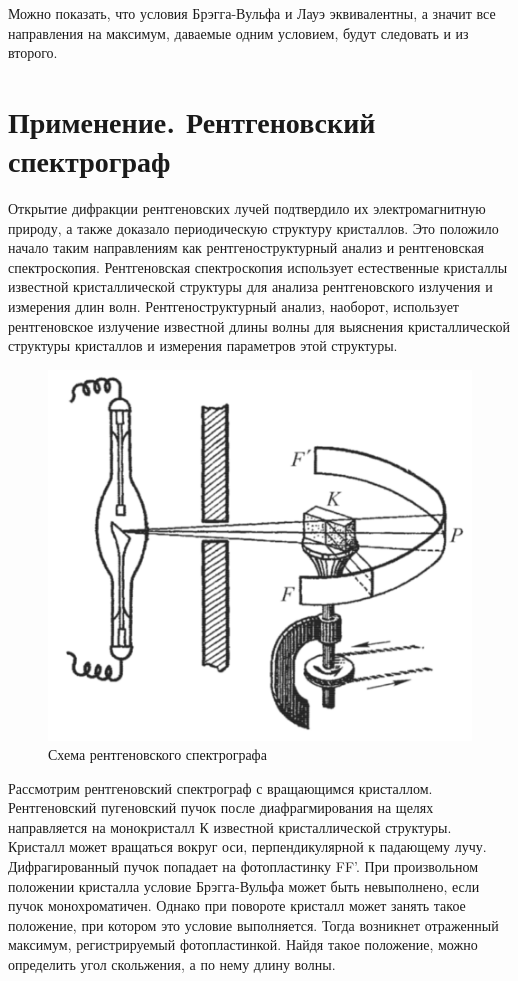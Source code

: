 \documentclass[12pt]{kiarticle} %
\begin{document}
Можно показать, что условия Брэгга-Вульфа и Лауэ эквивалентны, а значит все направления на максимум, даваемые одним условием, будут следовать и из второго. 

\section{Применение. Рентгеновский спектрограф}
Открытие дифракции рентгеновских лучей подтвердило их электромагнитную природу, а также доказало периодическую структуру кристаллов. Это положило начало таким направлениям как рентгеноструктурный анализ и рентгеновская спектроскопия. Рентгеновская спектроскопия использует естественные кристаллы известной кристаллической структуры для анализа рентгеновского излучения и измерения длин волн. Рентгеноструктурный анализ, наоборот, использует рентгеновское излучение известной длины волны для выяснения кристаллической структуры кристаллов и измерения параметров этой структуры.

\begin{figure}[H]
	\begin{center}
		\includegraphics[width=0.6\linewidth]{pic5.png}
		\caption{Схема рентгеновского спектрографа} 
	\end{center}
\end{figure}
\vspace{-30pt}
Рассмотрим рентгеновский спектрограф с вращающимся кристаллом. Рентгеновский пугеновский пучок после диафрагмирования на щелях направляется на монокристалл К известной кристаллической структуры.
Кристалл может вращаться вокруг оси, перпендикулярной к падающему лучу. Дифрагированный пучок попадает на фотопластинку FF'. При произвольном положении кристалла условие Брэгга-Вульфа может быть невыполнено, если пучок монохроматичен. Однако при повороте кристалл может занять такое положение, при котором это условие выполняется. Тогда возникнет отраженный максимум, регистрируемый фотопластинкой. Найдя такое положение, можно определить угол скольжения, а по нему длину волны.
\end{document}
